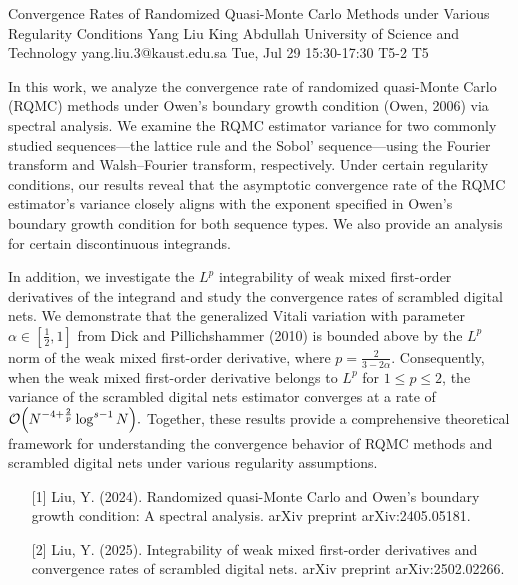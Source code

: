 \begin{talk}
  {Convergence Rates of Randomized Quasi-Monte Carlo Methods under Various Regularity Conditions}%
  {Yang Liu}%
  {King Abdullah University of Science and Technology}%
  {yang.liu.3@kaust.edu.sa}%
  {}%
  {}%
  {Tue, Jul 29 15:30-17:30}%
  {T5-2}%
  {T5}%
  
				
        
        In this work, we analyze the convergence rate of randomized quasi-Monte Carlo (RQMC) methods under Owen's boundary growth condition (Owen, 2006) via spectral analysis. We examine the RQMC estimator variance for two commonly studied sequences—the lattice rule and the Sobol' sequence—using the Fourier transform and Walsh–Fourier transform, respectively. Under certain regularity conditions, our results reveal that the asymptotic convergence rate of the RQMC estimator's variance closely aligns with the exponent specified in Owen's boundary growth condition for both sequence types. We also provide an analysis for certain discontinuous integrands.

        In addition, we investigate the \(L^p\) integrability of weak mixed first-order derivatives of the integrand and study the convergence rates of scrambled digital nets. We demonstrate that the generalized Vitali variation with parameter \(\alpha \in \left[\frac{1}{2}, 1\right]\) from Dick and Pillichshammer (2010) is bounded above by the \(L^p\) norm of the weak mixed first-order derivative, where \(p = \frac{2}{3-2\alpha}\). Consequently, when the weak mixed first-order derivative belongs to \(L^p\) for \(1 \leq p \leq 2\), the variance of the scrambled digital nets estimator converges at a rate of
        \(
        \mathcal{O}\Bigl(N^{-4+\frac{2}{p}} \log^{s-1} N\Bigr).
        \)
        Together, these results provide a comprehensive theoretical framework for understanding the convergence behavior of RQMC methods and scrambled digital nets under various regularity assumptions.
        

\medskip

\begin{enumerate}
	\item[{[1]}] Liu, Y. (2024). Randomized quasi-Monte Carlo and Owen's boundary growth condition: A spectral analysis. arXiv preprint arXiv:2405.05181.
	\item[{[2]}] Liu, Y. (2025). Integrability of weak mixed first-order derivatives and convergence rates of scrambled digital nets. arXiv preprint arXiv:2502.02266.
\end{enumerate}


\end{talk}
